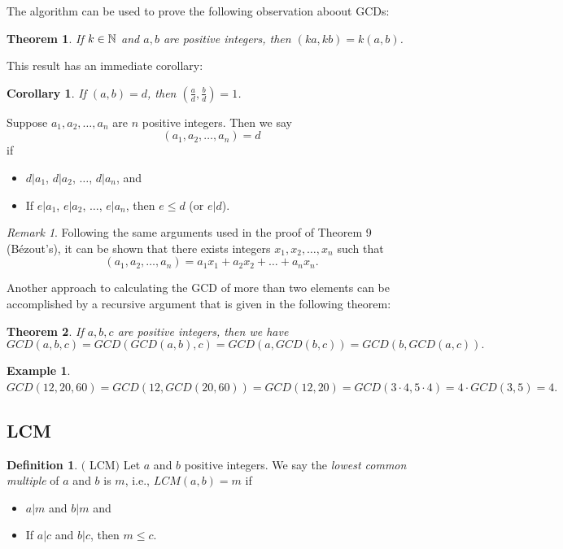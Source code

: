 \documentclass[12pt]{article}
\theoremstyle{plain}
\newtheorem{corollary}{Corollary}
\newtheorem{example}{Example}
\newtheorem{theorem}{Theorem}
\theoremstyle{definition}
\newtheorem{definition}{Definition}
\theoremstyle{remark}
\newtheorem{remark}{Remark}
\begin{document}
\bigskip
The algorithm can be used to prove the following observation aboout GCDs:
\begin{theorem}\label{factorout}
If $k\in \mathbb{N}$ and $a, b$ are positive integers, then $(ka, kb) = k(a,b)$.
\end{theorem}

\bigskip
This result has an immediate corollary:
\begin{corollary}
If $(a,b)=d$, then $(\frac{a}{d}, \frac{b}{d}) =1$.
\end{corollary}

\bigskip
{} Suppose $a_1, a_2, \dots, a_n$ are $n$ positive integers. Then we say
$$(a_1, a_2, \dots, a_n) = d$$ if
\begin{itemize}
    \item $d|a_1$, $d|a_2$, $\dots$, $d|a_n$, and
    \item If $e|a_1$, $e|a_2$, $\dots$, $e|a_n$, then $e\leq d$ (or $e|d$).
\end{itemize}

\begin{remark}
Following the same arguments used in the proof of Theorem 9 (B\'ezout's), it can be shown that there exists integers $x_1, x_2, \dots, x_n$ such that
$$(a_1, a_2, \dots, a_n) = a_1x_1+a_2x_2+\dots +a_nx_n.$$
\end{remark}

\bigskip
\noindent
Another approach to calculating the GCD of more than two elements can be accomplished by a recursive argument that is given in the following theorem:
\begin{theorem}
If $a, b, c$ are positive integers, then we have
$$GCD(a,b,c) = GCD(GCD(a,b),c) = GCD(a, GCD(b,c)) = GCD(b,GCD(a,c)).$$
\end{theorem}

\bigskip
\begin{example}
$GCD(12, 20, 60) = GCD(12,GCD(20,60)) = GCD(12,20)=GCD(3\cdot 4, 5\cdot 4) = 4\cdot GCD(3,5)=4.$
\end{example}

\subsection{LCM}
\begin{definition}$($ LCM$)$
Let $a$ and $b$ positive integers. We say the {\it lowest common multiple} of $a$ and $b$ is $m$, i.e., $LCM(a,b) = m$ if
\begin{itemize}
    \item $a|m$ and $b|m$ and
    \item If $a|c$ and $b|c$, then $m\leq c$.
\end{itemize}
\end{definition}
\end{document}

